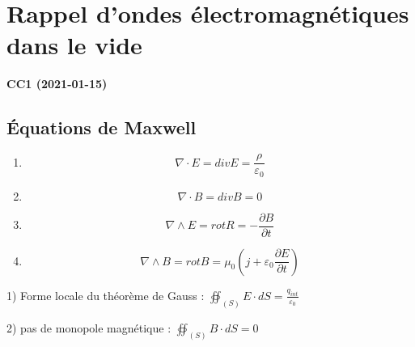 \documentclass[12pt,a4paper]{report}
\author{Malo Kerebel}
\begin{document}
\begin{titlepage}

\end{titlepage}

\tableofcontents

\chapter{Rappel d'ondes électromagnétiques dans le vide}

\begin{center}
\textbf{CC1 (2021-01-15)}
\end{center}

\section{Équations de Maxwell}

\begin{enumerate}
	\item \[
		\nabla \cdot E = div E = \dfrac{\rho}{\varepsilon_0}
	\]
	\item \[
		\nabla \cdot B = div B = 0
	\]
	\item \[
		\nabla \wedge E = rot R = -\dfrac{\partial B}{\partial t}
	\]
	\item \[
		\nabla \wedge B = rot B = \mu_0 \left( j + \varepsilon_0 \dfrac{\partial E}{\partial t} \right)
	\]
\end{enumerate}

1) Forme locale du théorème de Gauss : \( \oiint_{(S)} E \cdot dS = \frac{q_{int}}{\varepsilon_0}\)

2) pas de monopole magnétique : \( \oiint_{(S)} B \cdot dS = 0\)
\end{document}
